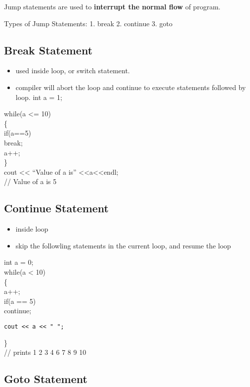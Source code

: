 \documentclass[
]{article}
\providecommand{\tightlist}{%
  \setlength{\itemsep}{0pt}\setlength{\parskip}{0pt}}
\begin{document}
Jump statements are used to \textbf{interrupt the normal flow} of
program.

Types of Jump Statements: 1. break 2. continue 3. goto

\subsection{Break Statement}\label{break-statement}

\begin{itemize}
\tightlist
\item
  used inside loop, or switch statement.
\item
  compiler will abort the loop and continue to execute statements
  followed by loop. int a = 1;
\end{itemize}

while(a \textless= 10)\\
\{\\
if(a==5)\\
break;\\
a++;\\
\}\\
cout \textless\textless{} ``Value of a is''
\textless\textless a\textless\textless endl;\\
// Value of a is 5

\subsection{Continue Statement}\label{continue-statement}

\begin{itemize}
\tightlist
\item
  inside loop
\item
  skip the followling statements in the current loop, and resume the
  loop
\end{itemize}

int a = 0;\\
while(a \textless{} 10)\\
\{\\
a++;\\
if(a == 5)\\
continue;

\begin{verbatim}
cout << a << " ";  
\end{verbatim}

\}\\
// prints 1 2 3 4 6 7 8 9 10

\subsection{Goto Statement}\label{goto-statement}
\end{document}
